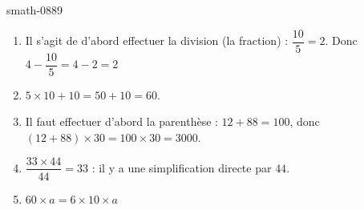 
\begin{corrige}{smath-0889}

        \begin{enumerate}
            \item
                Il s'agit de d'abord effectuer la division (la fraction) : \( \dfrac{ 10 }{ 5 }=2\). Donc \( 4-\dfrac{ 10 }{ 5 }=4-2=2\)
            \item
                \( 5\times 10+10=50+10=60\).
            \item
                Il faut effectuer d'abord la parenthèse : \( 12+88=100\), donc
                \( (12+88)\times 30=100\times 30=3000\).
            \item
                \( \dfrac{ 33\times 44 }{ 44 }=33\) : il y a une simplification directe par \( 44\).
            \item
                \( 60\times a=6\times 10 \times a\)
        \end{enumerate}

\end{corrige}
